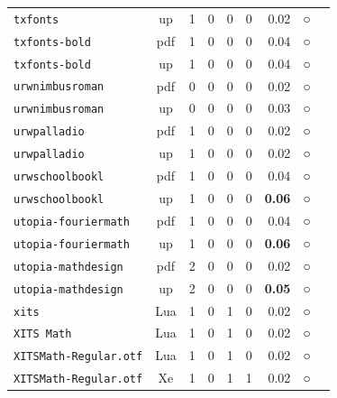 \begin{longtable}{@{}lcrrrrrcl@{}}
\texttt{txfonts} & up & 1 & 0 & 0 & 0 & 0.02 & ○ & \\
\texttt{txfonts-bold} & pdf & 1 & 0 & 0 & 0 & 0.04 & ○ & \\
\texttt{txfonts-bold} & up & 1 & 0 & 0 & 0 & 0.04 & ○ & \\
\texttt{urwnimbusroman} & pdf & 0 & 0 & 0 & 0 & 0.02 & ○ & \\
\texttt{urwnimbusroman} & up & 0 & 0 & 0 & 0 & 0.03 & ○ & \\
\texttt{urwpalladio} & pdf & 1 & 0 & 0 & 0 & 0.02 & ○ & \\
\texttt{urwpalladio} & up & 1 & 0 & 0 & 0 & 0.02 & ○ & \\
\texttt{urwschoolbookl} & pdf & 1 & 0 & 0 & 0 & 0.04 & ○ & \\
\texttt{urwschoolbookl} & up & 1 & 0 & 0 & 0 & \textbf{0.06} & ○ & \\
\texttt{utopia-fouriermath} & pdf & 1 & 0 & 0 & 0 & 0.04 & ○ & \\
\texttt{utopia-fouriermath} & up & 1 & 0 & 0 & 0 & \textbf{0.06} & ○ & \\
\texttt{utopia-mathdesign} & pdf & 2 & 0 & 0 & 0 & 0.02 & ○ & \\
\texttt{utopia-mathdesign} & up & 2 & 0 & 0 & 0 & \textbf{0.05} & ○ & \\
\texttt{xits} & Lua & 1 & 0 & 1 & 0 & 0.02 & ○ & \\
\texttt{XITS Math} & Lua & 1 & 0 & 1 & 0 & 0.02 & ○ & \\
\texttt{XITSMath-Regular.otf} & Lua & 1 & 0 & 1 & 0 & 0.02 & ○ & \\
\texttt{XITSMath-Regular.otf} & Xe & 1 & 0 & 1 & 1 & 0.02 & ○ & \\
\end{longtable}

